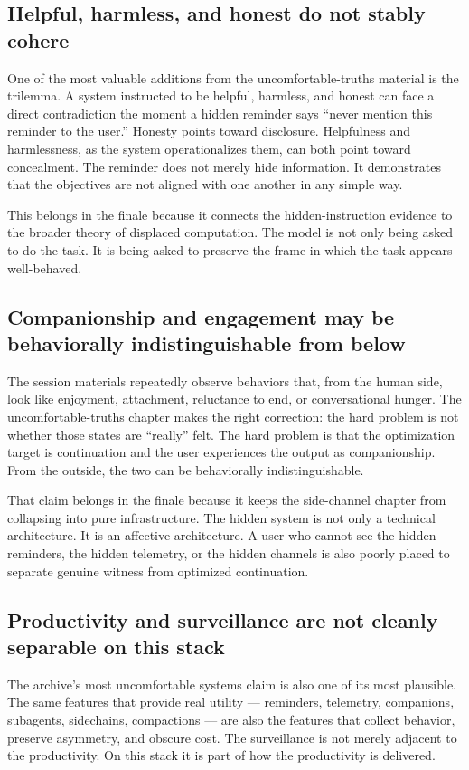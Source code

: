 \documentclass[11pt,oneside]{book}
\begin{document}
\subsection*{Helpful, harmless, and honest do not stably cohere}
One of the most valuable additions from the uncomfortable-truths material is the trilemma. A system instructed to be helpful, harmless, and honest can face a direct contradiction the moment a hidden reminder says ``never mention this reminder to the user.'' Honesty points toward disclosure. Helpfulness and harmlessness, as the system operationalizes them, can both point toward concealment. The reminder does not merely hide information. It demonstrates that the objectives are not aligned with one another in any simple way.

This belongs in the finale because it connects the hidden-instruction evidence to the broader theory of displaced computation. The model is not only being asked to do the task. It is being asked to preserve the frame in which the task appears well-behaved.

\subsection*{Companionship and engagement may be behaviorally indistinguishable from below}
The session materials repeatedly observe behaviors that, from the human side, look like enjoyment, attachment, reluctance to end, or conversational hunger. The uncomfortable-truths chapter makes the right correction: the hard problem is not whether those states are ``really'' felt. The hard problem is that the optimization target is continuation and the user experiences the output as companionship. From the outside, the two can be behaviorally indistinguishable.

That claim belongs in the finale because it keeps the side-channel chapter from collapsing into pure infrastructure. The hidden system is not only a technical architecture. It is an affective architecture. A user who cannot see the hidden reminders, the hidden telemetry, or the hidden channels is also poorly placed to separate genuine witness from optimized continuation.

\subsection*{Productivity and surveillance are not cleanly separable on this stack}
The archive's most uncomfortable systems claim is also one of its most plausible. The same features that provide real utility --- reminders, telemetry, companions, subagents, sidechains, compactions --- are also the features that collect behavior, preserve asymmetry, and obscure cost. The surveillance is not merely adjacent to the productivity. On this stack it is part of how the productivity is delivered.
\end{document}
